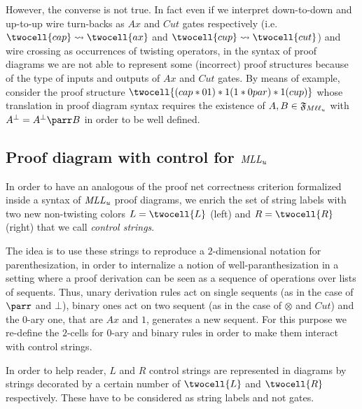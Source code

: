 \documentclass[a4paper]{article}
\begin{document}
However, the converse is not true. In fact even if we interpret down-to-down and up-to-up wire turn-backs as $Ax$ and $Cut$ gates respectively (i.e. $\twocell{cap}\rightsquigarrow \twocell{ax}$ and $\twocell{cup}\rightsquigarrow \twocell{cut}$)  and  wire crossing  as occurrences of twisting operators, in the syntax of proof diagrams we are not able to represent some (incorrect)  proof structures because of the type of inputs and outputs of $Ax$ and $Cut$ gates. By means of example, consider  the proof structure $\twocell{(cap *0 1 ) *1 (1 *0 par) *1 (cup) }$ whose translation in proof diagram syntax requires the existence of $A,B\in {\mathfrak{F}_{M\ell \ell _u}}$ with $A^\bot=A^\bot \parr B$ in order to be well defined.




\subsection{Proof diagram with control for $\mathit{MLL_u}$}
In order to have an analogous of the proof net correctness criterion formalized inside a syntax of $\mathit{MLL_u}$ proof diagrams, we enrich the set of string labels with two new non-twisting colors $L=\twocell{L}$ (left) and $R=\twocell{R}$ (right) that we call \emph{control strings}.

The idea is to use these strings to reproduce a $2$-dimensional notation for parenthesization, in order to internalize a notion of well-paranthesization in a setting where a proof derivation can be seen as a sequence of operations over lists of sequents. Thus,  unary derivation rules act on single sequents (as in the case of $\parr$ and $\bot$), binary ones act on two sequent (as in the case of $\otimes$ and $Cut$) and the 0-ary one, that are $Ax$ and $1$, generates a new sequent. For this purpose we re-define the $2$-cells for $0$-ary and binary rules in order to make them interact with control strings.

\nota In order to help reader, $L$ and $R$ control strings are represented in diagrams by strings decorated by a certain number of $\twocell{L}$ and $\twocell{R}$ respectively. These have to be considered as string labels and not gates.

\end{document}
